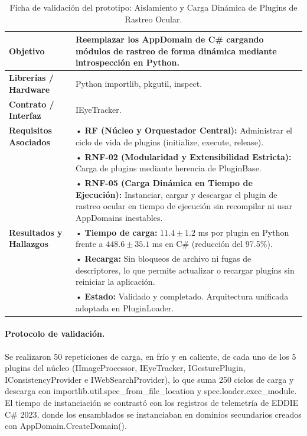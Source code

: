 \begin{table}[H]
    \centering
    \caption{Ficha de validación del prototipo: Aislamiento y Carga Dinámica de Plugins de Rastreo Ocular.}
    \label{tab:ficha_f11}
    \begin{tabular}{|L{3.2cm}|L{11.0cm}|}
        \hline
        \textbf{Objetivo} & Reemplazar los AppDomain de C\# cargando módulos de rastreo de forma dinámica mediante introspección en Python. \\ \hline
        \textbf{Librerías / Hardware} & Python importlib, pkgutil, inspect. \\ \hline
        \textbf{Contrato / Interfaz} & IEyeTracker. \\ \hline
        \textbf{Requisitos Asociados} &
        • \textbf{RF (Núcleo y Orquestador Central):} Administrar el ciclo de vida de plugins (initialize, execute, release). \vspace{0.1cm} \\
        & • \textbf{RNF-02 (Modularidad y Extensibilidad Estricta):} Carga de plugins mediante herencia de PluginBase. \vspace{0.1cm} \\
        & • \textbf{RNF-05 (Carga Dinámica en Tiempo de Ejecución):} Instanciar, cargar y descargar el plugin de rastreo ocular en tiempo de ejecución sin recompilar ni usar AppDomains inestables. \\ \hline
        \textbf{Resultados y Hallazgos} &
        • \textbf{Tiempo de carga:} $11.4 \pm 1.2$ ms por plugin en Python frente a $448.6 \pm 35.1$ ms en C\# (reducción del 97.5\%). \vspace{0.1cm} \\
        & • \textbf{Recarga:} Sin bloqueos de archivo ni fugas de descriptores, lo que permite actualizar o recargar plugins sin reiniciar la aplicación. \vspace{0.1cm} \\
        & • \textbf{Estado:} Validado y completado. Arquitectura unificada adoptada en PluginLoader. \\ \hline
    \end{tabular}
\end{table}
 
\paragraph{Protocolo de validación.} Se realizaron 50 repeticiones de carga, en frío y en caliente, de cada uno de los 5 plugins del núcleo (IImageProcessor, IEyeTracker, IGesturePlugin, IConsistencyProvider e IWebSearchProvider), lo que suma 250 ciclos de carga y descarga con importlib.util.spec\_from\_file\_location y spec.loader.exec\_module. El tiempo de instanciación se contrastó con los registros de telemetría de EDDIE C\# 2023, donde los ensamblados se instanciaban en dominios secundarios creados con AppDomain.CreateDomain().
 
